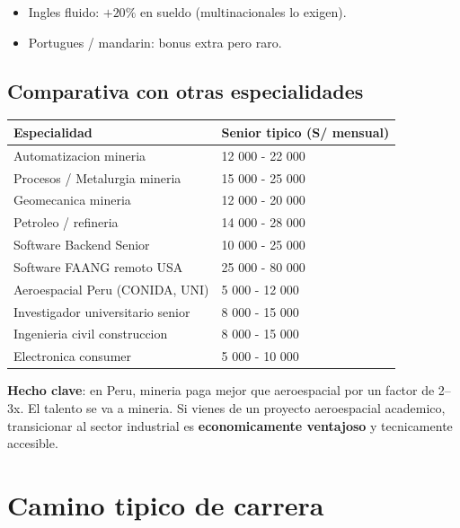\documentclass[11pt,a4paper,oneside]{report}
\begin{document}
\begin{itemize}[leftmargin=2em]
  \item Ingles fluido: $+20\%$ en sueldo (multinacionales lo exigen).
  \item Portugues / mandarin: bonus extra pero raro.
\end{itemize}

\section{Comparativa con otras especialidades}

\begin{center}
\begin{tabular}{ll}
\toprule
\textbf{Especialidad} & \textbf{Senior tipico (S/ mensual)} \\
\midrule
Automatizacion mineria               & 12 000 - 22 000 \\
Procesos / Metalurgia mineria        & 15 000 - 25 000 \\
Geomecanica mineria                  & 12 000 - 20 000 \\
Petroleo / refineria                 & 14 000 - 28 000 \\
Software Backend Senior              & 10 000 - 25 000 \\
Software FAANG remoto USA            & 25 000 - 80 000 \\
Aeroespacial Peru (CONIDA, UNI)      &  5 000 - 12 000 \\
Investigador universitario senior    &  8 000 - 15 000 \\
Ingenieria civil construccion        &  8 000 - 15 000 \\
Electronica consumer                 &  5 000 - 10 000 \\
\bottomrule
\end{tabular}
\end{center}

\begin{datos}
\textbf{Hecho clave}: en Peru, mineria paga mejor que aeroespacial por un
factor de 2--3x. El talento se va a mineria. Si vienes de un proyecto
aeroespacial academico, transicionar al sector industrial es \textbf{economicamente
ventajoso} y tecnicamente accesible.
\end{datos}

\chapter{Camino tipico de carrera}
\end{document}
